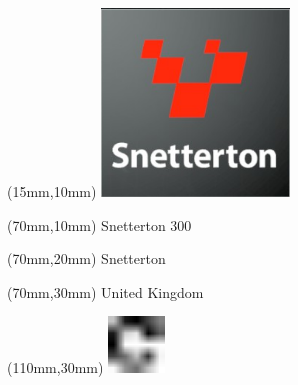 \null\newpage
\begin{textblock*}{50mm}(15mm,10mm)%
\includegraphics[width=50mm]{LG/2015-05-20_00095.png}
\end{textblock*}
\begin{textblock*}{130mm}(70mm,10mm)%
{\fontsize{20}{20}\selectfont Snetterton 300}\\
\end{textblock*}
\begin{textblock*}{120mm}(70mm,20mm)%
{\fontsize{16}{16}\selectfont Snetterton}\\
\end{textblock*}
\begin{textblock*}{120mm}(70mm,30mm)%
{\fontsize{12}{12}\selectfont United Kingdom}
\end{textblock*}
\begin{textblock*}{30mm}(110mm,30mm)%
\centering
\includegraphics[height=15mm]{icons/fa-rotate-right.pdf}
\end{textblock*}
